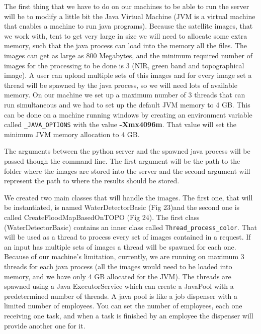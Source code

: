 \documentclass[12pt, a4paper]{report}
\begin{document}
\quad 
The first thing that we have to do on our machines to be able to run the server will be to modify a little bit the Java Virtual Machine (JVM is a virtual machine that enables a machine to run java programs). Because the satellite images, that we work with, tent to get very large in size we will need to allocate some extra memory, such that the java process can load into the memory all the files. The images can get as large as 800 Megabytes, and the minimum required number of images for the processing to be done is 3 (NIR, green band and topographical image). A user can upload multiple sets of this images and for every image set a thread will be spawned by the java process, so we will need lots of available memory. On our machine we set up a maximum number of 3 threads that can run simultaneous and we had to set up the default JVM memory to 4 GB. This can be done on a machine running windows by  creating an environment variable called \texttt{\_JAVA\_OPTIONS} with the value \textbf{-Xmx4096m}. That value will set the minimum JVM memory allocation to 4 GB.
\par 

The arguments between the python server and the spawned java process will be passed though the command line. The first argument will be the path to the folder where the images are stored into the server and the second argument will represent the path to where the results should be stored.
\par 

We created two main classes that will handle the images. The first one, that will be instantiated, is named WaterDetectorBasic (Fig 23)and the second one is called CreateFloodMapBasedOnTOPO (Fig 24). The first class (WaterDetectorBasic) contains an inner class called \texttt{Thread\_process\_color}. That will be used as a thread to process every set of images contained in a request. If an input has multiple sets of images a thread will be spawned for each one. Because of our machine's limitation, currently, we are running on maximum 3 threads for each java process (all the images would need to be loaded into memory, and we have only 4 GB allocated for the JVM). The threads are spawned using a Java ExecutorService which can create a JavaPool with a predetermined number of threads. A java pool is like a job dispenser with a limited number of employees. You can set the number of employees, each one receiving one task, and when a task is finished by an employee the dispenser will provide another one for it.
\end{document}
